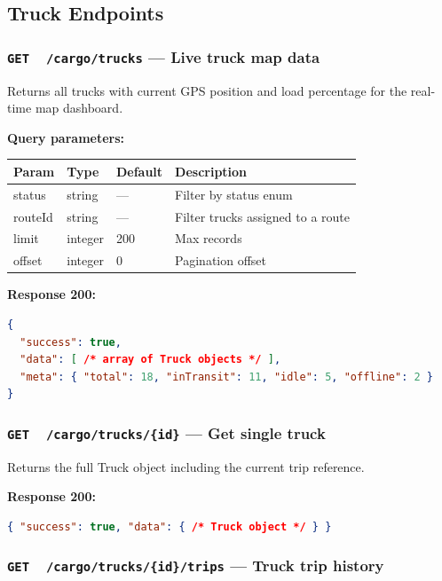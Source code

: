 \documentclass{article}
\newcommand{\GET}{\colorbox{evblue!20}{\texttt{\textbf{\color{evblue}GET}}}}
\begin{document}
\subsection{Truck Endpoints}

\subsubsection{\GET\ \ \texttt{/cargo/trucks} --- Live truck map data}

Returns all trucks with current GPS position and load percentage for the
real-time map dashboard.

\textbf{Query parameters:}

\begin{center}
\begin{tabular}{>{\ttfamily}llll}
\toprule
\textbf{Param} & \textbf{Type} & \textbf{Default} & \textbf{Description}\\
\midrule
status    & string  & ---   & Filter by status enum\\
routeId   & string  & ---   & Filter trucks assigned to a route\\
limit     & integer & 200   & Max records\\
offset    & integer & 0     & Pagination offset\\
\bottomrule
\end{tabular}
\end{center}

\textbf{Response 200:}
\begin{lstlisting}[language=json, caption=Live truck list response]
{
  "success": true,
  "data": [ /* array of Truck objects */ ],
  "meta": { "total": 18, "inTransit": 11, "idle": 5, "offline": 2 }
}
\end{lstlisting}

\subsubsection{\GET\ \ \texttt{/cargo/trucks/\{id\}} --- Get single truck}

Returns the full Truck object including the current trip reference.

\textbf{Response 200:}
\begin{lstlisting}[language=json]
{ "success": true, "data": { /* Truck object */ } }
\end{lstlisting}

\subsubsection{\GET\ \ \texttt{/cargo/trucks/\{id\}/trips} --- Truck trip history}
\end{document}
